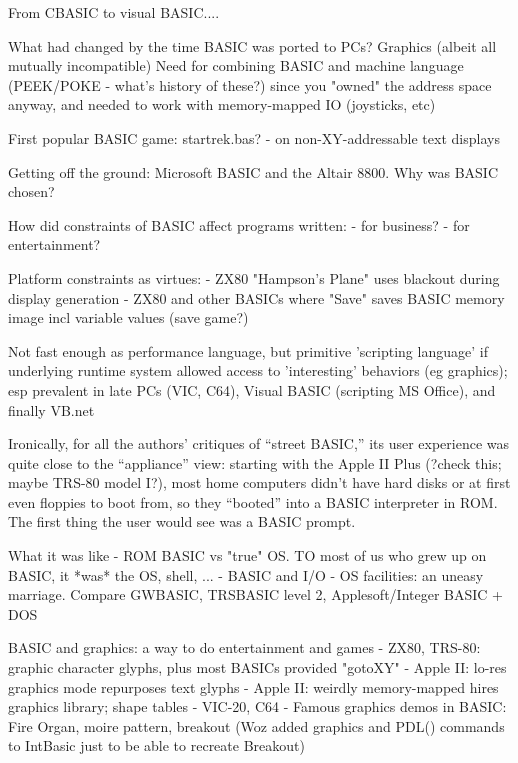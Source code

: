 \documentclass{article}
\begin{document}
From CBASIC to visual BASIC....


What had changed by the time BASIC was ported to PCs?
   Graphics (albeit all mutually incompatible)
   Need for combining BASIC and machine language (PEEK/POKE - what's
   history of these?) since you "owned" the address space anyway, and
   needed to work with memory-mapped IO (joysticks, etc)

First popular BASIC game: startrek.bas?
  - on non-XY-addressable text displays

Getting off the ground: Microsoft BASIC and the Altair 8800.  Why was
    BASIC chosen?


How did constraints of BASIC affect programs written:
- for business?
- for entertainment?



Platform constraints as virtues:
 - ZX80 "Hampson's Plane" uses blackout during display generation 
 - ZX80 and other BASICs where "Save" saves BASIC memory image incl
 variable values (save game?)



Not fast enough as performance language, but primitive 'scripting
language' if underlying runtime system allowed access to 'interesting'
behaviors (eg graphics); esp prevalent in late PCs (VIC, C64), Visual
BASIC (scripting MS Office), and finally VB.net

Ironically, for all the authors' critiques of ``street BASIC,'' its user
experience was quite close to the ``appliance'' view: starting with the
Apple II Plus (?check this; maybe TRS-80 model I?), most home computers
didn't have hard disks or at first even floppies to boot from, so they
``booted'' into a BASIC interpreter in ROM.  The first thing the user
would see was a BASIC prompt. 


What it was like
  - ROM BASIC vs "true" OS.  TO most of us who grew up on BASIC, it
  *was* the OS, shell, ...
  - BASIC and I/O - OS facilities: an uneasy marriage.  Compare GWBASIC,
  TRSBASIC level 2, Applesoft/Integer BASIC + DOS

BASIC and graphics: a way to do entertainment and games
  - ZX80, TRS-80: graphic character glyphs, plus most BASICs provided "gotoXY"
  - Apple II: lo-res graphics mode repurposes text glyphs
  - Apple II: weirdly memory-mapped hires graphics library; shape tables
  - VIC-20, C64
  - Famous graphics demos in BASIC: Fire Organ, moire pattern, breakout
  (Woz added graphics and PDL() commands to IntBasic just to be able to
  recreate Breakout)
\end{document}

